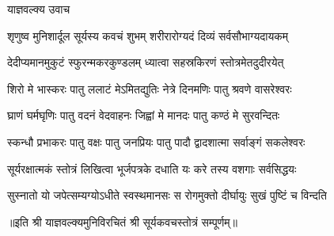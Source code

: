 

याज्ञवल्क्य उवाच

\twolineshloka
{शृणुष्व मुनिशार्दूल सूर्यस्य कवचं शुभम्}
{शरीरारोग्यदं दिव्यं सर्वसौभाग्यदायकम्}

\twolineshloka
{देदीप्यमानमुकुटं स्फुरन्मकरकुण्डलम्}
{ध्यात्वा सहस्रकिरणं स्तोत्रमेतदुदीरयेत्}

\twolineshloka
{शिरो मे भास्करः पातु ललाटं मेऽमितद्युतिः}
{नेत्रे दिनमणिः पातु श्रवणे वासरेश्वरः}

\twolineshloka
{घ्राणं घर्मघृणिः पातु वदनं वेदवाहनः}
{जिह्वां मे मानदः पातु कण्ठं मे सुरवन्दितः}

\twolineshloka
{स्कन्धौ प्रभाकरः पातु वक्षः पातु जनप्रियः}
{पातु पादौ द्वादशात्मा सर्वाङ्गं सकलेश्वरः}

\twolineshloka
{सूर्यरक्षात्मकं स्तोत्रं लिखित्वा भूर्जपत्रके}
{दधाति यः करे तस्य वशगाः सर्वसिद्धयः}

\twolineshloka
{सुस्नातो यो जपेत्सम्यग्योऽधीते स्वस्थमानसः}
{स रोगमुक्तो दीर्घायुः सुखं पुष्टिं च विन्दति}

॥इति श्री याज्ञवल्क्यमुनिविरचितं श्री सूर्यकवचस्तोत्रं सम्पूर्णम्॥